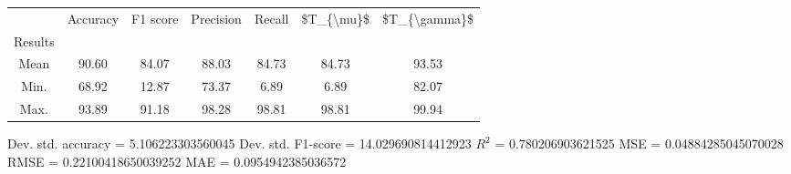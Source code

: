 \begin{tabular}{|c|c|c|c|c|c|c|}
\toprule
{} &  Accuracy &  F1 score &  Precision &  Recall &  \$T\_\{\textbackslash mu\}\$ &  \$T\_\{\textbackslash gamma\}\$ \\
Results &           &           &            &         &            &               \\
\hline
Mean    &     90.60 &     84.07 &      88.03 &   84.73 &      84.73 &         93.53 \\
Min.    &     68.92 &     12.87 &      73.37 &    6.89 &       6.89 &         82.07 \\
Max.    &     93.89 &     91.18 &      98.28 &   98.81 &      98.81 &         99.94 \\
\bottomrule
\end{tabular}

 Dev. std. accuracy = 5.106223303560045
 Dev. std. F1-score = 14.029690814412923
 $R^2$ = 0.780206903621525
 MSE = 0.04884285045070028
 RMSE = 0.22100418650039252
 MAE = 0.0954942385036572